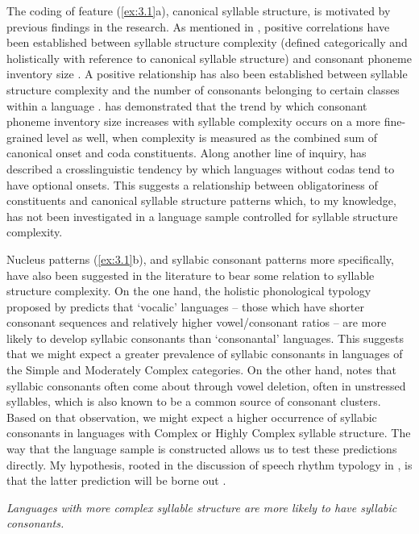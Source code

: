   The coding of feature (\ref{ex:3.1}a), canonical syllable structure, is motivated by previous findings in the research. As mentioned in , positive correlations have been established between syllable structure complexity (defined categorically and holistically with reference to canonical syllable structure) and consonant phoneme inventory size \citep{Maddieson2013a}. A positive relationship has also been established between syllable structure complexity and the number of consonants belonging to certain classes within a language \citep{MaddiesonEtAl2013}. \citet{Gordon2016} has demonstrated that the trend by which consonant phoneme inventory size increases with syllable complexity occurs on a more fine-grained level as well, when complexity is measured as the combined sum of canonical onset and coda constituents. Along another line of inquiry, \citet[336]{Blevins2006} has described a crosslinguistic tendency by which languages without codas tend to have optional onsets. This suggests a relationship between obligatoriness of constituents and canonical syllable structure patterns which, to my knowledge, has not been investigated in a language sample controlled for syllable structure complexity.

  Nucleus patterns (\ref{ex:3.1}b), and syllabic consonant patterns more specifically, have also been suggested in the literature to bear some relation to syllable structure complexity. On the one hand, the holistic phonological typology proposed by \citet{Isačenko1939/1940} predicts that ‘vocalic’ languages -- those which have shorter consonant sequences and relatively higher vowel/consonant ratios -- are more likely to develop syllabic consonants than ‘consonantal’ languages. This suggests that we might expect a greater prevalence of syllabic consonants in languages of the Simple and Moderately Complex categories. On the other hand, \citet{Bell1978a} notes that syllabic consonants often come about through vowel deletion, often in unstressed syllables, which is also known to be a common source of consonant clusters. Based on that observation, we might expect a higher occurrence of syllabic consonants in languages with Complex or Highly Complex syllable structure. The way that the language sample is constructed allows us to test these predictions directly. My hypothesis, rooted in the discussion of speech rhythm typology in , is that the latter prediction will be borne out .

\ea\label{ex:3.3}
   \textit{Languages with more complex syllable structure are more likely to have syllabic consonants.}
\z

